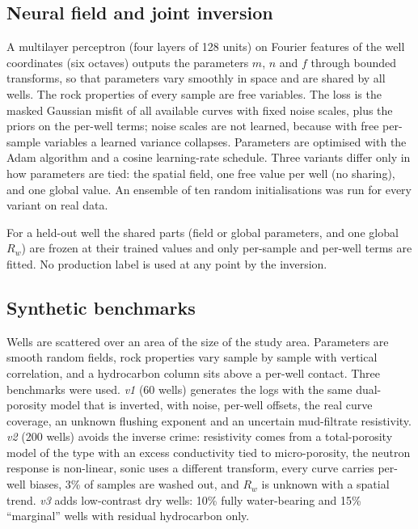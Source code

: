 \documentclass[preprint,12pt]{elsarticle}
\begin{document}
\subsection{Neural field and joint inversion}
A multilayer perceptron (four layers of 128 units) on Fourier features of the well coordinates
(six octaves) outputs the parameters $m$, $n$ and $f$ through bounded transforms, so that
parameters vary smoothly in space and are shared by all wells. The rock properties of every
sample are free variables. The loss is the masked Gaussian misfit of all available curves with
fixed noise scales, plus the priors on the per-well terms; noise scales are not learned, because
with free per-sample variables a learned variance collapses. Parameters are optimised with the
Adam algorithm and a cosine learning-rate schedule. Three variants differ only in how parameters
are tied: the spatial field, one free value per well (no sharing), and one global value. An
ensemble of ten random initialisations was run for every variant on real data.

For a held-out well the shared parts (field or global parameters, and one global $R_w$) are
frozen at their trained values and only per-sample and per-well terms are fitted. No production
label is used at any point by the inversion.

\subsection{Synthetic benchmarks}
Wells are scattered over an area of the size of the study area. Parameters are smooth random
fields, rock properties vary sample by sample with vertical correlation, and a hydrocarbon
column sits above a per-well contact. Three benchmarks were used.
\emph{v1} (60 wells) generates the logs with the same dual-porosity model that is inverted,
with noise, per-well offsets, the real curve coverage, an unknown flushing exponent and an
uncertain mud-filtrate resistivity.
\emph{v2} (200 wells) avoids the inverse crime: resistivity comes from a total-porosity model
of the \citet{waxman1968} type with an excess conductivity tied to micro-porosity, the neutron
response is non-linear, sonic uses a different transform, every curve carries per-well biases,
3\% of samples are washed out, and $R_w$ is unknown with a spatial trend.
\emph{v3} adds low-contrast dry wells: 10\% fully water-bearing and 15\% ``marginal'' wells with
residual hydrocarbon only.
\end{document}
